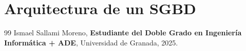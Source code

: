 \documentclass[a4paper,12pt]{book}
\begin{document}
\chapter{Arquitectura de un SGBD}

 



\newpage
\begin{thebibliography}{99}
Ismael Sallami Moreno, \textbf{Estudiante del Doble Grado en Ingeniería Informática + ADE}, Universidad de Granada, 2025.

\end{thebibliography}
\end{document}
